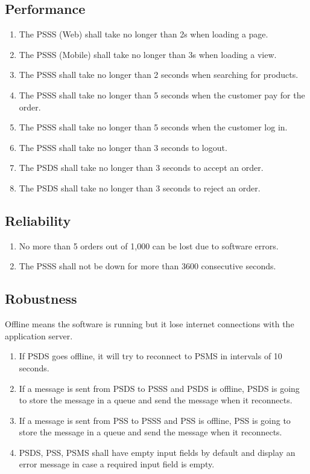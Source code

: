 \subsection{Performance}
\begin{enumerate}[label=PER-\arabic*]
    \item The PSSS (Web) shall take no longer than 2s when loading a page.
    \item The PSSS (Mobile) shall take no longer than 3s when loading a view. 
    \item The PSSS shall take no longer than 2 seconds when searching for 
    products.
    \item The PSSS shall take no longer than 5 seconds when the customer 
    pay for the order.
    \item The PSSS shall take no longer than 5 seconds when the customer 
    log in.
    \item The PSSS shall take no longer than 3 seconds to logout.
    \item The PSDS shall take no longer than 3 seconds to accept an order.
    \item The PSDS shall take no longer than 3 seconds to reject an order.
    
\end{enumerate}

\subsection{Reliability}
\begin{enumerate}[label=REL-\arabic*]
    \item No more than 5 orders out of 1,000 can be lost due to software errors.
    \item The PSSS shall not be down for more than 3600 consecutive seconds.
\end{enumerate}
\pagebreak
\subsection{Robustness}
Offline means the software is running but it lose internet connections 
with the application server.

\begin{enumerate}[label=ROB-\arabic*]
    \item If PSDS goes offline, it will try to reconnect to PSMS in 
    intervals of 10 seconds.
    \item If a message is sent from PSDS to PSSS and PSDS is offline, PSDS is 
    going to store the message in a queue and send the message 
    when it reconnects.
    \item If a message is sent from PSS to PSSS and PSS is offline, PSS is 
    going to store the message in a queue and send the message 
    when it reconnects.
    \item PSDS, PSS, PSMS shall have empty input fields by default and display 
    an error message in case a required input field is empty.
\end{enumerate}

